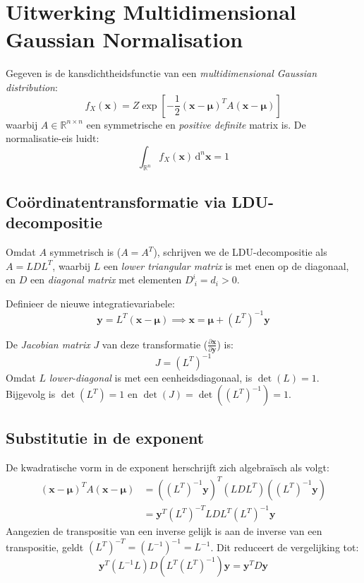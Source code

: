 \documentclass{article}
\begin{document}
\section*{Uitwerking Multidimensional Gaussian Normalisation}

Gegeven is de kansdichtheidsfunctie van een \textit{multidimensional Gaussian distribution}:
\begin{equation}
    f_X(\mathbf{x}) = Z \exp\left[ -\frac{1}{2} (\mathbf{x} - \boldsymbol{\mu})^T A (\mathbf{x} - \boldsymbol{\mu}) \right]
\end{equation}
waarbij $A \in \mathbb{R}^{n \times n}$ een symmetrische en \textit{positive definite} matrix is. De normalisatie-eis luidt:
\begin{equation}
    \int_{\mathbb{R}^n} f_X(\mathbf{x}) \, \mathrm{d}^n\mathbf{x} = 1
\end{equation}

\subsection*{Co\"ordinatentransformatie via LDU-decompositie}
Omdat $A$ symmetrisch is ($A = A^T$), schrijven we de LDU-decompositie als $A = L D L^T$, waarbij $L$ een \textit{lower triangular matrix} is met enen op de diagonaal, en $D$ een \textit{diagonal matrix} met elementen $D^i_{\ i} = d_i > 0$.

Definieer de nieuwe integratievariabele:
\begin{equation}
    \mathbf{y} = L^T (\mathbf{x} - \boldsymbol{\mu}) \implies \mathbf{x} = \boldsymbol{\mu} + (L^T)^{-1}\mathbf{y}
\end{equation}

De \textit{Jacobian matrix} $J$ van deze transformatie ($\frac{\partial \mathbf{x}}{\partial \mathbf{y}}$) is:
\begin{equation}
    J = (L^T)^{-1}
\end{equation}
Omdat $L$ \textit{lower-diagonal} is met een eenheidsdiagonaal, is $\det(L) = 1$. Bijgevolg is $\det(L^T) = 1$ en $\det(J) = \det((L^T)^{-1}) = 1$.

\subsection*{Substitutie in de exponent}
De kwadratische vorm in de exponent herschrijft zich algebra\"isch als volgt:
\begin{align}
    (\mathbf{x} - \boldsymbol{\mu})^T A (\mathbf{x} - \boldsymbol{\mu}) &= \left( (L^T)^{-1}\mathbf{y} \right)^T (L D L^T) \left( (L^T)^{-1}\mathbf{y} \right) \\
    &= \mathbf{y}^T (L^T)^{-T} L D L^T (L^T)^{-1} \mathbf{y}
\end{align}
Aangezien de transpositie van een inverse gelijk is aan de inverse van een transpositie, geldt $(L^T)^{-T} = (L^{-1})^{-1} = L^{-1}$. Dit reduceert de vergelijking tot:
\begin{equation}
    \mathbf{y}^T (L^{-1} L) D (L^T (L^T)^{-1}) \mathbf{y} = \mathbf{y}^T D \mathbf{y}
\end{equation}
\end{document}
